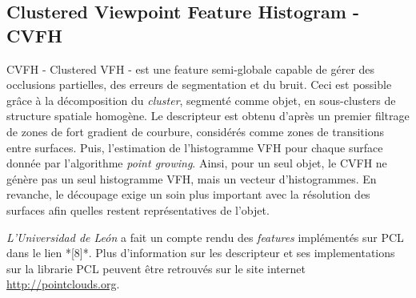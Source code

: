 \subsection{Clustered Viewpoint Feature Histogram - CVFH} CVFH -
Clustered VFH - est une feature semi-globale capable de gérer
des occlusions partielles, des erreurs de segmentation et du bruit. Ceci est possible grâce à la
décomposition du \textit{cluster}, segmenté comme objet, en sous-clusters de
structure spatiale homogène. Le descripteur est obtenu d'après un premier
filtrage de zones de fort gradient de courbure, considérés comme zones de
transitions entre surfaces. Puis, l'estimation de l'histogramme VFH pour chaque surface 
donnée par l'algorithme \textit{point growing}. Ainsi, pour un seul objet, le CVFH ne génère pas un seul histogramme VFH, mais un vecteur d'histogrammes.
En revanche, le découpage exige un soin plus important avec la résolution des surfaces afin quelles restent représentatives de l'objet.

\begin{figure}[H]
\end{figure}


\textit{L'Universidad de León } a fait un compte rendu des
\textit{features} implémentés sur PCL dans le lien *[8]*. Plus
d'information sur les descripteur et ses implementations sur la
librarie PCL peuvent être retrouvés sur le site
internet \url{http://pointclouds.org}. 


